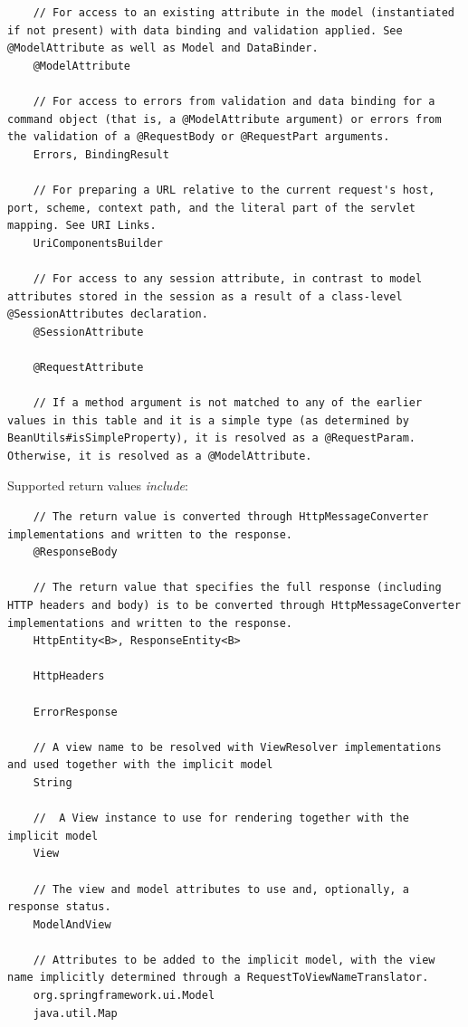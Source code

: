 \documentclass{scrartcl}
\begin{document}
\begin{lstlisting}
    // For access to an existing attribute in the model (instantiated if not present) with data binding and validation applied. See @ModelAttribute as well as Model and DataBinder.
    @ModelAttribute

    // For access to errors from validation and data binding for a command object (that is, a @ModelAttribute argument) or errors from the validation of a @RequestBody or @RequestPart arguments.
    Errors, BindingResult

    // For preparing a URL relative to the current request's host, port, scheme, context path, and the literal part of the servlet mapping. See URI Links.
    UriComponentsBuilder

    // For access to any session attribute, in contrast to model attributes stored in the session as a result of a class-level @SessionAttributes declaration.
    @SessionAttribute

    @RequestAttribute

    // If a method argument is not matched to any of the earlier values in this table and it is a simple type (as determined by BeanUtils#isSimpleProperty), it is resolved as a @RequestParam. Otherwise, it is resolved as a @ModelAttribute.
    \end{lstlisting}

    Supported return values \textit{include}:

    \begin{lstlisting}
    // The return value is converted through HttpMessageConverter implementations and written to the response.
    @ResponseBody

    // The return value that specifies the full response (including HTTP headers and body) is to be converted through HttpMessageConverter implementations and written to the response.
    HttpEntity<B>, ResponseEntity<B>

    HttpHeaders

    ErrorResponse

    // A view name to be resolved with ViewResolver implementations and used together with the implicit model
    String

    //  A View instance to use for rendering together with the implicit model
    View

    // The view and model attributes to use and, optionally, a response status.
    ModelAndView

    // Attributes to be added to the implicit model, with the view name implicitly determined through a RequestToViewNameTranslator.
    org.springframework.ui.Model
    java.util.Map
    \end{lstlisting}
\end{document}
